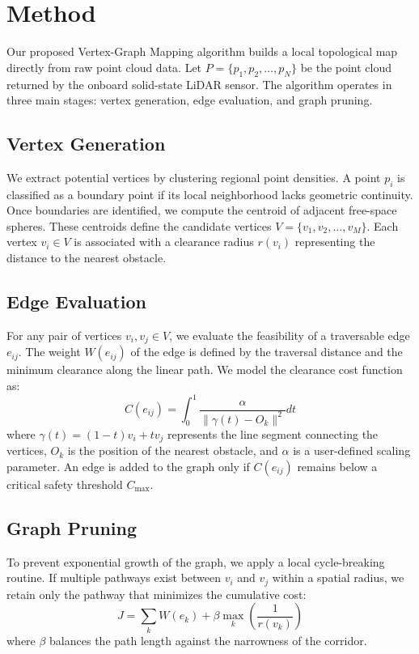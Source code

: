 \section{Method}
Our proposed Vertex-Graph Mapping algorithm builds a local topological map directly from raw point cloud data. Let $P = \{p_1, p_2, \dots, p_N\}$ be the point cloud returned by the onboard solid-state LiDAR sensor. The algorithm operates in three main stages: vertex generation, edge evaluation, and graph pruning.

\subsection{Vertex Generation}
We extract potential vertices by clustering regional point densities. A point $p_i$ is classified as a boundary point if its local neighborhood lacks geometric continuity. Once boundaries are identified, we compute the centroid of adjacent free-space spheres. These centroids define the candidate vertices $V = \{v_1, v_2, \dots, v_M\}$. Each vertex $v_i \in V$ is associated with a clearance radius $r(v_i)$ representing the distance to the nearest obstacle.

\subsection{Edge Evaluation}
For any pair of vertices $v_i, v_j \in V$, we evaluate the feasibility of a traversable edge $e_{ij}$. The weight $W(e_{ij})$ of the edge is defined by the traversal distance and the minimum clearance along the linear path. We model the clearance cost function as:
\begin{equation}
  C(e_{ij}) = \int_{0}^{1} \frac{\alpha}{\| \gamma(t) - O_k \|^2} dt
  \label{eq:clearance}
\end{equation}
where $\gamma(t) = (1-t)v_i + tv_j$ represents the line segment connecting the vertices, $O_k$ is the position of the nearest obstacle, and $\alpha$ is a user-defined scaling parameter. An edge is added to the graph only if $C(e_{ij})$ remains below a critical safety threshold $C_{\text{max}}$.

\subsection{Graph Pruning}
To prevent exponential growth of the graph, we apply a local cycle-breaking routine. If multiple pathways exist between $v_i$ and $v_j$ within a spatial radius, we retain only the pathway that minimizes the cumulative cost:
\begin{equation}
  J = \sum_{k} W(e_k) + \beta \max_{k} \left( \frac{1}{r(v_k)} \right)
  \label{eq:cost}
\end{equation}
where $\beta$ balances the path length against the narrowness of the corridor.
